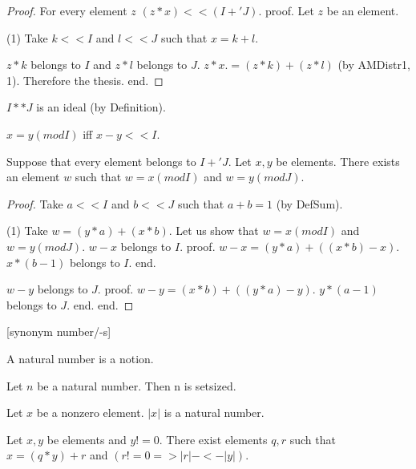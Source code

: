 \documentclass{document}
\begin{document}
\begin{forthel}
\begin{proof}
      For every element $z$ $(z * x) << (I +' J)$.
      proof.
        Let $z$ be an element.

        (1) Take $k << I$ and $l << J$ such that $x = k + l$.

        $z * k$ belongs to $I$ and $z * l$ belongs to $J$. $z * x .= (z * k) + (z * l)$ (by AMDistr1, 1). Therefore the thesis.
      end.
    \end{proof}


    \begin{lemma}[IdeInt]
      $I ** J$ is an ideal (by Definition).
    \end{lemma}

    \begin{definition}[DefMod]
      $x = y (mod I)$ iff $x - y << I$.
    \end{definition}

    \begin{theorem}[ChineseRemainder]
      Suppose that every element belongs to $I +' J$. Let $x, y$ be elements. There exists an element $w$ such that $w = x (mod I)$ and $w = y (mod J)$.
    \end{theorem}
    \begin{proof}
      Take $a << I$ and $b << J$ such that $a + b = 1$ (by DefSum).

      (1) Take $w = (y * a) + (x * b)$.
      Let us show that $w = x (mod I)$ and $w = y (mod J)$.
        $w - x$ belongs to $I$.
        proof.
          $w - x = (y * a) + ((x * b) - x)$. $x * (b - 1)$ belongs to $I$.
        end.

        $w - y$ belongs to $J$.
        proof.
          $w - y = (x * b) + ((y * a) - y)$. $y * (a - 1)$ belongs to $J$.
        end.
      end.
    \end{proof}


    [synonym number/-s]

    \begin{signature}[NatSort]
      A natural number is a notion.
    \end{signature}

    \begin{axiom}
      Let $n$ be a natural number. Then n is setsized.
    \end{axiom}

    \begin{signature}[EucSort]
      Let $x$ be a nonzero element. $|x|$ is a natural number.
    \end{signature}

    \begin{axiom}[Division]
      Let $x,y$ be elements and $y != 0$. There exist elements $q,r$ such that $x = (q * y) + r$ and $(r != 0 => |r| -<- |y|)$.
    \end{axiom}



\end{forthel}
\end{document}
